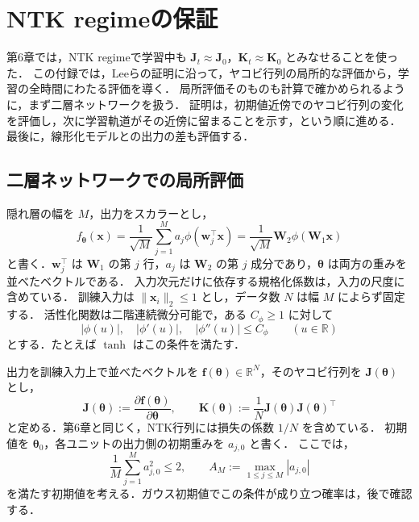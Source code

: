 \documentclass[../main.tex]{subfiles}
\begin{document}
\ifSubfilesClassLoaded{\appendix}{}

\chapter{NTK regimeの保証}
\label{app:ntk-stability}

第6章では，NTK regimeで学習中も $\bm{J}_t\approx\bm{J}_0$，$\bm{K}_t\approx\bm{K}_0$ とみなせることを使った．
この付録では，Leeら\cite{lee2019wide}の証明に沿って，ヤコビ行列の局所的な評価から，学習の全時間にわたる評価を導く．
局所評価そのものも計算で確かめられるように，まず二層ネットワークを扱う．
証明は，初期値近傍でのヤコビ行列の変化を評価し，次に学習軌道がその近傍に留まることを示す，という順に進める．
最後に，線形化モデルとの出力の差も評価する．

\section{二層ネットワークでの局所評価}

隠れ層の幅を $M$，出力をスカラーとし，
\begin{equation}
  f_{\bm{\theta}}(\bm{x})
  =\frac1{\sqrt{M}}\sum_{j=1}^M
    a_j\phi(\bm{w}_j^\top\bm{x})
  =\frac1{\sqrt{M}}\bm{W}_2\phi(\bm{W}_1\bm{x})
  \label{eq:app-ntk-network}
\end{equation}
と書く．$\bm{w}_j^\top$ は $\bm{W}_1$ の第 $j$ 行，$a_j$ は $\bm{W}_2$ の第 $j$ 成分であり，$\bm{\theta}$ は両方の重みを並べたベクトルである．
入力次元だけに依存する規格化係数は，入力の尺度に含めている．
訓練入力は $\|\bm{x}_i\|_2\leq1$ とし，データ数 $N$ は幅 $M$ によらず固定する．
活性化関数は二階連続微分可能で，ある $C_\phi\geq1$ に対して
\begin{equation}
  |\phi(u)|,\quad |\phi'(u)|,\quad |\phi''(u)|\leq C_\phi
  \qquad(u\in\mathbb{R})
  \label{eq:app-ntk-activation}
\end{equation}
とする．たとえば $\tanh$ はこの条件を満たす．

出力を訓練入力上で並べたベクトルを $\bm{f}(\bm{\theta})\in\mathbb{R}^N$，そのヤコビ行列を $\bm{J}(\bm{\theta})$ とし，
\begin{equation}
  \bm{J}(\bm{\theta})
  :=\frac{\partial\bm{f}(\bm{\theta})}{\partial\bm{\theta}},
  \qquad
  \bm{K}(\bm{\theta})
  :=\frac1N\bm{J}(\bm{\theta})\bm{J}(\bm{\theta})^\top
  \label{eq:app-ntk-definitions}
\end{equation}
と定める．第6章と同じく，NTK行列には損失の係数 $1/N$ を含めている．
初期値を $\bm{\theta}_0$，各ユニットの出力側の初期重みを $a_{j,0}$ と書く．
ここでは，
\begin{equation}
  \frac1M\sum_{j=1}^M a_{j,0}^2\leq2,
  \qquad
  A_M:=\max_{1\leq j\leq M}|a_{j,0}|
  \label{eq:app-ntk-initial-weights}
\end{equation}
を満たす初期値を考える．ガウス初期値でこの条件が成り立つ確率は，後で確認する．
\end{document}
